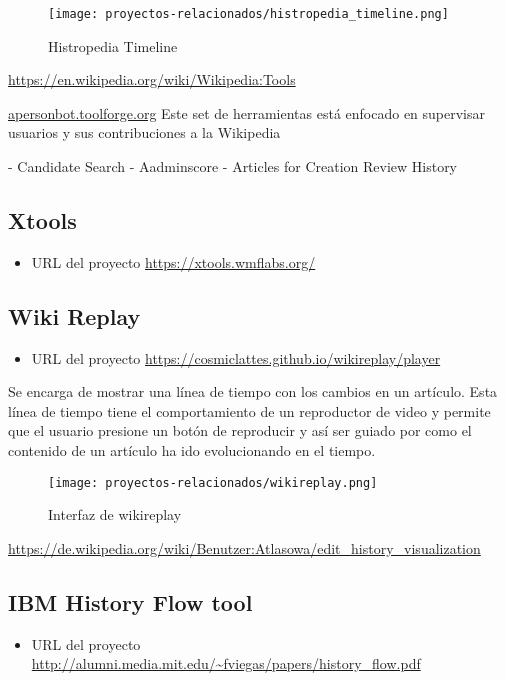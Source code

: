 \begin{figure}[H]
    \centering
    \texttt{[image: proyectos-relacionados/histropedia\_timeline.png]}
    \caption{Histropedia Timeline}
    \label{fig:histropedia_timeline}
\end{figure}


\url{https://en.wikipedia.org/wiki/Wikipedia:Tools}

\url{apersonbot.toolforge.org}
Este set de herramientas está enfocado en supervisar usuarios y sus contribuciones a la Wikipedia

- Candidate Search
- Aadminscore
- Articles for Creation Review History

\subsection{Xtools}
\begin{itemize}
    \item URL del proyecto \url{https://xtools.wmflabs.org/}
\end{itemize}

\subsection{Wiki Replay}
\begin{itemize}
    \item URL del proyecto \url{https://cosmiclattes.github.io/wikireplay/player}
\end{itemize}

Se encarga de mostrar una línea de tiempo con los cambios en un artículo. Esta línea de tiempo
tiene el comportamiento de un reproductor de video y permite que el usuario presione un botón de
reproducir y así ser guiado por como el contenido de un artículo ha ido evolucionando en el tiempo.

\begin{figure}[H]
    \centering
    \texttt{[image: proyectos-relacionados/wikireplay.png]}
    \caption{Interfaz de wikireplay}
    \label{wikireplay}
\end{figure}


\url{https://de.wikipedia.org/wiki/Benutzer:Atlasowa/edit_history_visualization}

\subsection{IBM History Flow tool}

\begin{itemize}
    \item URL del proyecto \url{http://alumni.media.mit.edu/~fviegas/papers/history_flow.pdf}
\end{itemize}

